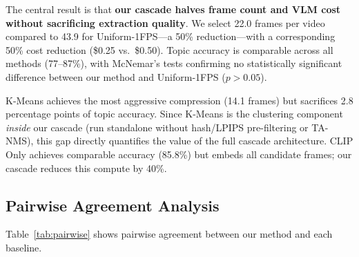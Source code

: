 The central result is that \textbf{our cascade halves frame count and VLM cost without sacrificing extraction quality}. We select 22.0 frames per video compared to 43.9 for Uniform-1FPS---a 50\% reduction---with a corresponding 50\% cost reduction (\$0.25 vs.\ \$0.50). Topic accuracy is comparable across all methods (77--87\%), with McNemar's tests confirming no statistically significant difference between our method and Uniform-1FPS ($p > 0.05$).

K-Means achieves the most aggressive compression (14.1 frames) but sacrifices 2.8 percentage points of topic accuracy. Since K-Means is the clustering component \textit{inside} our cascade (run standalone without hash/LPIPS pre-filtering or TA-NMS), this gap directly quantifies the value of the full cascade architecture. CLIP Only achieves comparable accuracy (85.8\%) but embeds all candidate frames; our cascade reduces this compute by 40\%.


\subsection{Pairwise Agreement Analysis}

Table~\ref{tab:pairwise} shows pairwise agreement between our method and each baseline.

\begin{table}[t]
\centering
\caption{Pairwise agreement between our method and baselines. Topic agreement $>$90\% across all methods indicates semantic equivalence. $N$ = videos with valid extractions from both methods.}
\label{tab:pairwise}
\end{table}


